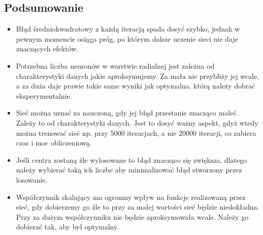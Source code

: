 \documentclass[a4paper, portrait,11pt]{article}
\begin{document}
\subsection{Podsumowanie}
\begin{itemize}
  \item Błąd średniokwadratowy z każdą iteracją spada dosyć szybko, jednak w pewnym momencie osiąga próg, po którym dalsze uczenie sieci nie daje znaczących efektów.
  \item Potrzebna liczba neuronów w warstwie radialnej jest zależna od charakterystyki danych jakie aproksymujemy. Za mała nie przybliży jej wcale, a za duża daje prawie takie same wyniki jak optymalna, którą należy dobrać eksperymentalnie.
  \item Sieć można uznać za nauczoną, gdy jej błąd przestanie znacząco maleć. Zależy to od charakterystyki danych. Jest to dosyć ważny aspekt, gdyż wtedy można trenować sieć np. przy 5000 iteracjach, a nie 20000 iteracji, co zabiera czas i moc obliczeniową.
  \item Jeśli centra zostaną źle wylosowane to błąd znacząco się zwiększa, dlatego należy wybierać taką ich liczbe aby minimalizować błąd stworzony przez losowanie.
  \item Współczynnik skalujący ma ogromny wpływ na funkcje realizowaną przez sieć, gdy dobierzemy go źle to przy za małej wartości sieć będzie niedokładna. Przy za dużym współczynniku nie będzie aproksymowała wcale. Należy go dobierać tak, aby był optymalny.
\end{itemize}
\end{document}
